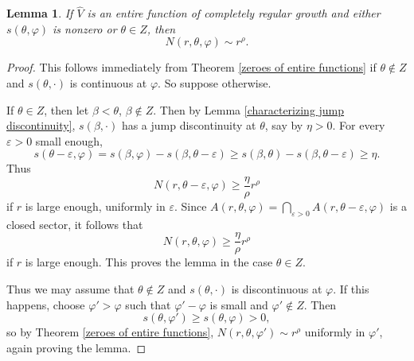 \documentclass[reqno,12pt,letterpaper]{amsart}
\newtheorem{lemma}[theorem]{Lemma}
\theoremstyle{definition}
\begin{document}
\begin{lemma}
\label{zeroes of entire functions with jump discontinuity}
If $\widehat V$ is an entire function of completely regular growth and either $s(\theta, \varphi)$ is nonzero or $\theta \in Z$, then
$$N(r, \theta, \varphi) \sim r^\rho.$$
\end{lemma}
\begin{proof}
This follows immediately from Theorem \ref{zeroes of entire functions} if $\theta \notin Z$ and $s(\theta, \cdot)$ is continuous at $\varphi$.
So suppose otherwise.

If $\theta \in Z$, then let $\beta < \theta$, $\beta \notin Z$.
Then by Lemma \ref{characterizing jump discontinuity}, $s(\beta, \cdot)$ has a jump discontinuity at $\theta$, say by $\eta > 0$.
For every $\varepsilon > 0$ small enough,
$$s(\theta - \varepsilon, \varphi) = s(\beta, \varphi) - s(\beta, \theta - \varepsilon) \geq s(\beta, \theta) - s(\beta, \theta - \varepsilon) \geq \eta.$$
Thus
$$N(r, \theta - \varepsilon, \varphi) \geq \frac{\eta}{\rho}r^\rho$$
if $r$ is large enough, uniformly in $\varepsilon$. Since $A(r, \theta, \varphi) = \bigcap_{\varepsilon > 0} A(r, \theta - \varepsilon, \varphi)$
is a closed sector, it follows that
$$N(r, \theta, \varphi) \geq \frac{\eta}{\rho}r^\rho$$
if $r$ is large enough. This proves the lemma in the case $\theta \in Z$.

Thus we may assume that $\theta \notin Z$ and $s(\theta, \cdot)$ is discontinuous at $\varphi$.
If this happens, choose $\varphi' > \varphi$ such that $\varphi' - \varphi$ is small and $\varphi' \notin Z$. Then
$$s(\theta, \varphi') \geq s(\theta, \varphi) > 0,$$
so by Theorem \ref{zeroes of entire functions}, $N(r, \theta, \varphi') \sim r^\rho$ uniformly in $\varphi'$, again proving the lemma.
\end{proof}
\end{document}
